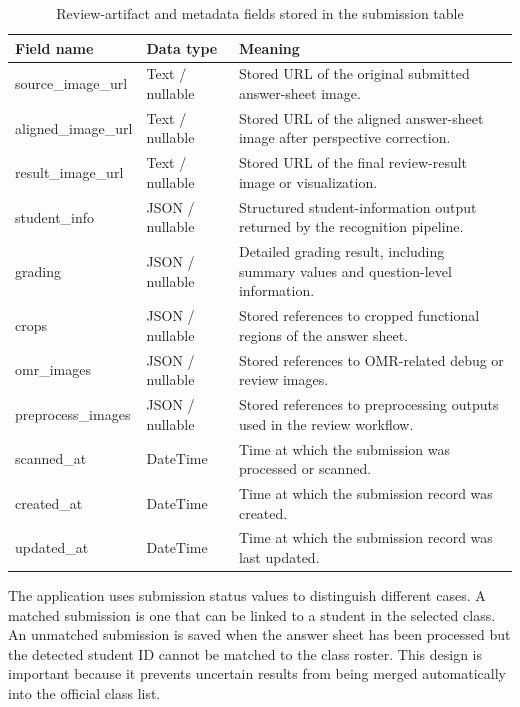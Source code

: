 \documentclass[../Main.tex]{subfiles}
\begin{document}
\begin{table}[H]
\centering
\caption{Review-artifact and metadata fields stored in the submission table}
\label{table:submission_fields_artifacts}
\scriptsize
\setlength{\tabcolsep}{3pt}
\renewcommand{\arraystretch}{1.15}
\begin{tabular}{|>{\raggedright\arraybackslash}p{}|>{\raggedright\arraybackslash}p{}|>{\raggedright\arraybackslash}p{}|}
\hline
\textbf{Field name} & \textbf{Data type} & \textbf{Meaning} \\ \hline
source\_image\_\newline url & Text / nullable & Stored URL of the original submitted answer-sheet image. \\ \hline
aligned\_image\_\newline url & Text / nullable & Stored URL of the aligned answer-sheet image after perspective correction. \\ \hline
result\_image\_\newline url & Text / nullable & Stored URL of the final review-result image or visualization. \\ \hline
student\_info & JSON / nullable & Structured student-information output returned by the recognition pipeline. \\ \hline
grading & JSON / nullable & Detailed grading result, including summary values and question-level information. \\ \hline
crops & JSON / nullable & Stored references to cropped functional regions of the answer sheet. \\ \hline
omr\_images & JSON / nullable & Stored references to OMR-related debug or review images. \\ \hline
preprocess\_\newline images & JSON / nullable & Stored references to preprocessing outputs used in the review workflow. \\ \hline
scanned\_at & DateTime & Time at which the submission was processed or scanned. \\ \hline
created\_at & DateTime & Time at which the submission record was created. \\ \hline
updated\_at & DateTime & Time at which the submission record was last updated. \\ \hline
\end{tabular}
\end{table}

The application uses submission status values to distinguish different cases. A
matched submission is one that can be linked to a student in the selected
class. An unmatched submission is saved when the answer sheet has been
processed but the detected student ID cannot be matched to the class roster.
This design is important because it prevents uncertain results from being
merged automatically into the official class list.
\end{document}
